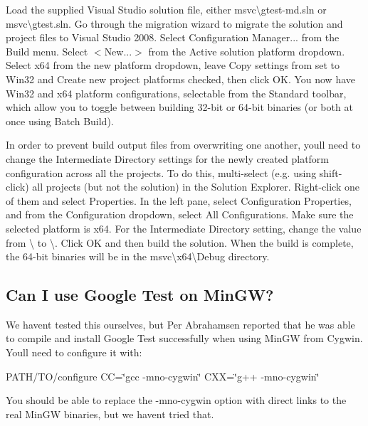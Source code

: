 Load the supplied Visual Studio solution file, either {\ttfamily msvc\textbackslash{}gtest-\/md.\+sln} or {\ttfamily msvc\textbackslash{}gtest.\+sln}. Go through the migration wizard to migrate the solution and project files to Visual Studio 2008. Select {\ttfamily Configuration Manager...} from the {\ttfamily Build} menu. Select {\ttfamily $<$New...$>$} from the {\ttfamily Active solution platform} dropdown. Select {\ttfamily x64} from the new platform dropdown, leave {\ttfamily Copy settings from} set to {\ttfamily Win32} and {\ttfamily Create new project platforms} checked, then click {\ttfamily OK}. You now have {\ttfamily Win32} and {\ttfamily x64} platform configurations, selectable from the {\ttfamily Standard} toolbar, which allow you to toggle between building 32-\/bit or 64-\/bit binaries (or both at once using Batch Build).

In order to prevent build output files from overwriting one another, you\textquotesingle{}ll need to change the {\ttfamily Intermediate Directory} settings for the newly created platform configuration across all the projects. To do this, multi-\/select (e.\+g. using shift-\/click) all projects (but not the solution) in the {\ttfamily Solution Explorer}. Right-\/click one of them and select {\ttfamily Properties}. In the left pane, select {\ttfamily Configuration Properties}, and from the {\ttfamily Configuration} dropdown, select {\ttfamily All Configurations}. Make sure the selected platform is {\ttfamily x64}. For the {\ttfamily Intermediate Directory} setting, change the value from {\ttfamily \textbackslash{}} to {\ttfamily \textbackslash{}}. Click {\ttfamily OK} and then build the solution. When the build is complete, the 64-\/bit binaries will be in the {\ttfamily msvc\textbackslash{}x64\textbackslash{}Debug} directory.

\subsection*{Can I use Google Test on Min\+GW?}

We haven\textquotesingle{}t tested this ourselves, but Per Abrahamsen reported that he was able to compile and install Google Test successfully when using Min\+GW from Cygwin. You\textquotesingle{}ll need to configure it with\+:

{\ttfamily P\+A\+T\+H/\+T\+O/configure CC=\char`\"{}gcc -\/mno-\/cygwin\char`\"{} C\+XX=\char`\"{}g++ -\/mno-\/cygwin\char`\"{}}

You should be able to replace the {\ttfamily -\/mno-\/cygwin} option with direct links to the real Min\+GW binaries, but we haven\textquotesingle{}t tried that.

